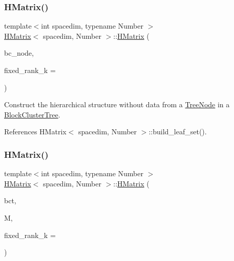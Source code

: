 \mbox{\label{classHMatrix_a4fe44a3aa2b813f593b787f24be56a1c}} 
\subsubsection{\texorpdfstring{H\+Matrix()}{HMatrix()}\hspace{0.1cm}{\footnotesize\ttfamily [3/9]}}
{\footnotesize\ttfamily template$<$int spacedim, typename Number $>$ \\
\hyperlink{classHMatrix}{H\+Matrix}$<$ spacedim, Number $>$\+::\hyperlink{classHMatrix}{H\+Matrix} (\begin{DoxyParamCaption}\item[{typename \hyperlink{classBlockClusterTree}{Block\+Cluster\+Tree}$<$ spacedim, Number $>$\+::node\+\_\+const\+\_\+pointer\+\_\+type}]{bc\+\_\+node,  }\item[{const unsigned int}]{fixed\+\_\+rank\+\_\+k = {} }\end{DoxyParamCaption})}

Construct the hierarchical structure without data from a \hyperlink{classTreeNode}{Tree\+Node} in a \hyperlink{classBlockClusterTree}{Block\+Cluster\+Tree}. 

References H\+Matrix$<$ spacedim, Number $>$\+::build\+\_\+leaf\+\_\+set().

\mbox{\label{classHMatrix_a8e7d103ec4f093870f9e792e26d6b915}} 
\subsubsection{\texorpdfstring{H\+Matrix()}{HMatrix()}\hspace{0.1cm}{\footnotesize\ttfamily [4/9]}}
{\footnotesize\ttfamily template$<$int spacedim, typename Number $>$ \\
\hyperlink{classHMatrix}{H\+Matrix}$<$ spacedim, Number $>$\+::\hyperlink{classHMatrix}{H\+Matrix} (\begin{DoxyParamCaption}\item[{const \hyperlink{classBlockClusterTree}{Block\+Cluster\+Tree}$<$ spacedim, Number $>$ \&}]{bct,  }\item[{const \hyperlink{classLAPACKFullMatrixExt}{L\+A\+P\+A\+C\+K\+Full\+Matrix\+Ext}$<$ Number $>$ \&}]{M,  }\item[{const unsigned int}]{fixed\+\_\+rank\+\_\+k = {} }\end{DoxyParamCaption})}

